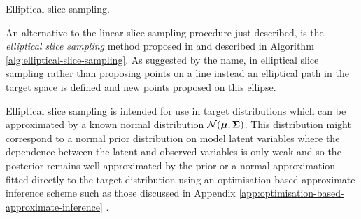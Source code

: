 \begin{algorithm}[!t]
\caption{Elliptical slice sampling.}
\label{alg:elliptical-slice-sampling}

\end{algorithm}

An alternative to the linear slice sampling procedure just described, is the \emph{elliptical slice sampling} method proposed in \citep{murray2010elliptical} and described in Algorithm \ref{alg:elliptical-slice-sampling}. As suggested by the name, in elliptical slice sampling rather than proposing points on a line instead an elliptical path in the target space is defined and new points proposed on this ellipse. 

Elliptical slice sampling is intended for use in target distributions which can be approximated by a known normal distribution $\nrm{\vct{\mu},\mtx{\Sigma}}$. This distribution might correspond to a normal prior distribution on model latent variables where the dependence between the latent and observed variables is only weak and so the posterior remains well approximated by the prior or a normal approximation fitted directly to the target distribution using an optimisation based approximate inference scheme such as those discussed in Appendix \ref{app:optimisation-based-approximate-inference} \citep{nishihara2014parallel}. 

